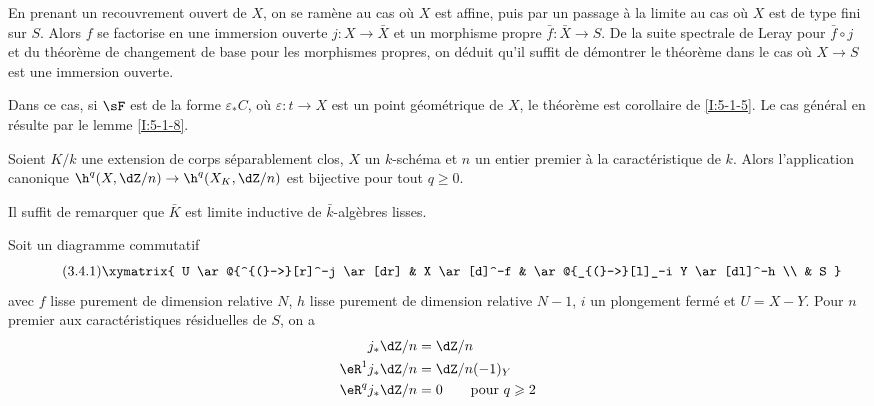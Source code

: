 En prenant un recouvrement ouvert de $X$, on se ramène au cas où $X$ est 
affine, puis par un passage à la limite au cas où $X$ est de type fini sur 
$S$. Alors $f$ se factorise en une immersion ouverte $j:X\to \bar X$ et un 
morphisme propre $\bar f:\bar X\to S$. De la suite spectrale de Leray pour 
$\bar f\circ j$ et du théorème de changement de base pour les morphismes 
propres, on déduit qu'il suffit de démontrer le théorème dans le cas 
où $X\to S$ est une immersion ouverte. 

Dans ce cas, si $\sF$ est de la forme $\varepsilon_* C$, où 
$\varepsilon:t\to X$ est un point géométrique de $X$, le théorème est 
corollaire de \ref{I:5-1-5}. Le cas général en résulte par le lemme 
\ref{I:5-1-8}. 





\begin{corollarydotdash}\label{I:5-3-3}
Soient $K/k$ une extension de corps séparablement clos, $X$ un $k$-schéma 
et $n$ un entier premier à la caractéristique de $k$. Alors l'application 
canonique $\h^q(X,\dZ/n) \to \h^q(X_K,\dZ/n)$ est bijective pour tout 
$q\geqslant 0$. 
\end{corollarydotdash}

Il suffit de remarquer que $\bar K$ est limite inductive de $\bar k$-algèbres 
lisses. 





\begin{theoremdotdash}\label{I:5-3-4}
Soit un diagramme commutatif 
\begingroup
\makeatletter
\tagsleft@true
\let\veqno\@@leqno
\makeatother
{}\begin{equation*}\tag{3.4.1}\label{I:eq:5-3-4-1}\xymatrix{
  U \ar@{^{(}->}[r]^-j \ar[dr]
    & X \ar[d]^-f 
    & \ar@{_{(}->}[l]_-i Y \ar[dl]^-h \\
  & S
}\end{equation*}
\endgroup
avec $f$ lisse purement de dimension relative $N$, $h$ lisse purement de 
dimension relative $N-1$, $i$ un plongement fermé et $U=X-Y$. Pour 
$n$ premier aux caractéristiques résiduelles de $S$, on a 
\begin{equation*}
\begin{aligned}
  j_* \dZ/n     &= \dZ/n \\
  \eR^1 j_*\dZ/n &= \dZ/n(-1)_Y \\
  \eR^q j_*\dZ/n &= 0 \qquad \text{pour $q\geqslant 2$}
\end{aligned}
\end{equation*}
\end{theoremdotdash}


